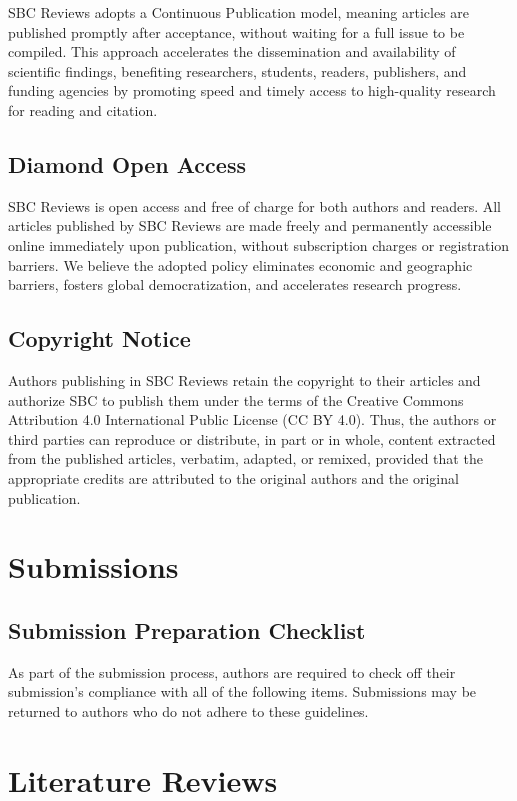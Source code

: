 \documentclass[english]{sbcreviews-2025}%
\begin{document}
SBC Reviews adopts a Continuous Publication model, meaning articles are published promptly after acceptance, without waiting for a full issue to be compiled. This approach accelerates the dissemination and availability of scientific findings, benefiting researchers, students, readers, publishers, and funding agencies by promoting speed and timely access to high-quality research for reading and citation.

\subsection{Diamond Open Access}

SBC Reviews is open access and free of charge for both authors and readers. All articles published by SBC Reviews are made freely and permanently accessible online immediately upon publication, without subscription charges or registration barriers. We believe the adopted policy eliminates economic and geographic barriers, fosters global democratization, and accelerates research progress.

\subsection{Copyright Notice}
Authors publishing in SBC Reviews retain the copyright to their articles and authorize SBC to publish them under the terms of the Creative Commons Attribution 4.0 International Public License (CC BY 4.0). Thus, the authors or third parties can reproduce or distribute, in part or in whole, content extracted from the published articles, verbatim, adapted, or remixed, provided that the appropriate credits are attributed to the original authors and the original publication.

\section{Submissions}

\subsection{Submission Preparation Checklist}
As part of the submission process, authors are required to check off their submission's compliance with all of the following items. Submissions may be returned to authors who do not adhere to these guidelines.


\section{Literature Reviews}
\end{document}
